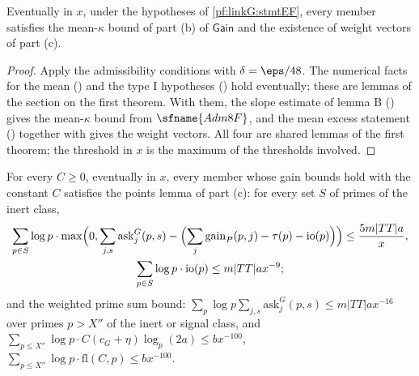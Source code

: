 \begin{proposition}\label{pf:linkG:meanw}
Eventually in $x$, under the hypotheses of \cref{pf:linkG:stmtEF}, every member satisfies the mean-$\kappa$ bound of part (b)
of $\mathsf{Gain}$ and the existence of weight vectors of part (c).
\end{proposition}

\begin{proof}
Apply the admissibility conditions with $\delta=\eps/48$. The numerical facts for the mean
() and the type I hypotheses
() hold eventually; these are lemmas of the section on the first
theorem. With them, the slope estimate of lemma B ()
gives the mean-$\kappa$ bound from $\sfname{Adm8F}$, and the mean excess statement
() together with
 gives the weight vectors. All four are shared
lemmas of the first theorem; the threshold in $x$ is the maximum of the thresholds involved.
\end{proof}

\begin{proposition}\label{pf:linkG:points}
For every $C\ge0$, eventually in $x$, every member whose gain bounds hold with the constant $C$ satisfies the points lemma of
part (c): for every set $S$ of primes of the inert class,
\begin{gather*}
\sum_{p\in S}\log p\cdot\max\Bigl(0,\sum_{j,s}\mathrm{ask}^G_j(p,s)-\Bigl(\sum_j\mathrm{gain}_P(p,j)-\tau(p)-\mathrm{io}(p)\Bigr)\Bigr)\le
\frac{5m|TT|a}x,\\
\sum_{p\in S}\log p\cdot\mathrm{io}(p)\le m|TT|ax^{-9};
\end{gather*}
and the weighted prime sum bound: $\sum_p\log p\sum_{j,s}\mathrm{ask}^G_j(p,s)\le m|TT|ax^{-16}$ over primes $p>X''$ of the inert or
signal class, and $\sum_{p\le X''}\log p\cdot C(c_G+\eta)\log_p(2a)\le bx^{-100}$, $\sum_{p\le X''}\log p\cdot\mathrm{fl}(C,p)\le
bx^{-100}$.
\end{proposition}

